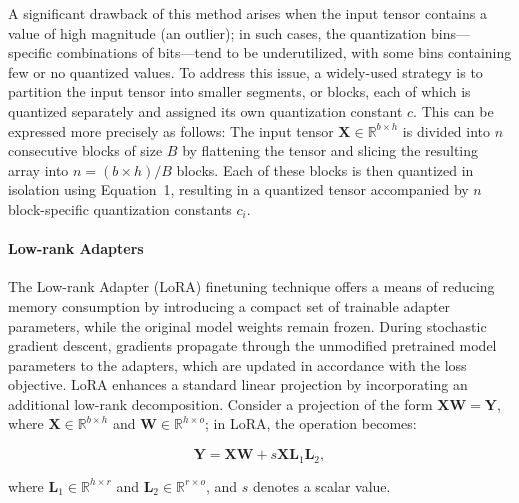 A significant drawback of this method arises when the input tensor contains a value of high magnitude (an outlier); in such cases, the quantization bins—specific combinations of bits—tend to be underutilized, with some bins containing few or no quantized values. To address this issue, a widely-used strategy is to partition the input tensor into smaller segments, or blocks, each of which is quantized separately and assigned its own quantization constant $c$. This can be expressed more precisely as follows: The input tensor $\mathbf{X}\in \mathbb{R}^{b\times h}$ is divided into $n$ consecutive blocks of size $B$ by flattening the tensor and slicing the resulting array into ${n = ({b\times h})/{B}}$ blocks. Each of these blocks is then quantized in isolation using Equation~1, resulting in a quantized tensor accompanied by $n$ block-specific quantization constants $c_i$.

\paragraph{Low-rank Adapters} The Low-rank Adapter (LoRA) finetuning technique \citep{hu2021lora} offers a means of reducing memory consumption by introducing a compact set of trainable adapter parameters, while the original model weights remain frozen. During stochastic gradient descent, gradients propagate through the unmodified pretrained model parameters to the adapters, which are updated in accordance with the loss objective. LoRA enhances a standard linear projection by incorporating an additional low-rank decomposition. Consider a projection of the form ${\mathbf{X} \mathbf{W} = \mathbf{Y}}$, where $\mathbf{X}\in  \mathbb{R}^{b\times h}$ and $\mathbf{W}\in  \mathbb{R}^{h\times o}$; in LoRA, the operation becomes:

\begin{equation}
    \mathbf{Y} = \mathbf{X}\mathbf{W} + s\mathbf{X}\mathbf{L}_1\mathbf{L}_2,
\end{equation}

where $\mathbf{L}_1\in  \mathbb{R}^{h\times r}$ and $\mathbf{L}_2\in  \mathbb{R}^{r\times o}$, and $s$ denotes a scalar value.

